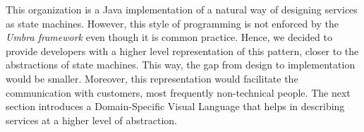This organization is a Java implementation of a natural way of designing services as state machines. 
However, this style of programming is not enforced by the {\em Umbra framework}
even though it is common practice. Hence, we decided to provide developers with a higher level representation of this pattern, closer
to the abstractions of state machines. This way, the gap from design to implementation would be smaller. 
Moreover, this representation would facilitate the communication with customers, most frequently
non-technical people. The next section introduces a Domain-Specific Visual Language that helps in describing 
services at a higher level of abstraction.


